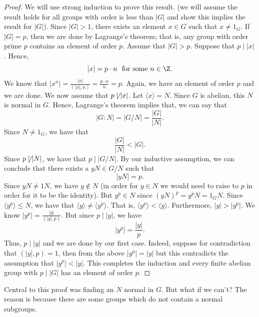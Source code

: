 \begin{proof}
We will use strong induction to prove this result. (we will assume the result holds for all  groups with order is less than \( | G  |  \) and show this implies the result for \( | G  |  \)). Since \( | G  |  > 1  \), there exists an element \( x \in G  \) such that \( x \neq {1}_{G} \). If \( | G  |  = p  \), then we are done by Lagrange's theorem; that is, any group with order prime \( p  \) contains an element of order \( p  \). Assume that \( | G  |  > p  \). Suppose that \( p \mid | x  |  \). Hence,  
\[  | x  |  = p \cdot n \ \ \text{for some} \ n \in \Z.  \]
We know that \( | x^{n}  |  = \frac{ | x  |  }{  (| x  | , n )  } = \frac{ p \cdot n   }{ n  }   = p  \). Again, we have an element of order \( p  \) and we are done. We now assume that \( p \not\mid | x  |  \). Let \( \langle  x  \rangle = N  \). Since \( G  \) is abelian, this \( N  \) is normal in \( G  \). Hence, Lagrange's theorem implies that, we can say that 
\[  | G : N  |  = \Big|   G/ N  \Big| = \frac{ | G  |  }{  | N  |  }.   \]
Since \( N \neq {1}_{G}  \), we have that 
\[  \frac{ | G  |  }{  | N  |  }  < |  G  |. \]
Since \( p \not\mid | N  |  \), we have that \( p \mid |  G /  N  |  \). By our inductive assumption, we can conclude that there exists a \( y N \in G / N  \) such that 
\[  | y N  |  = p. \]
Since \( y N \neq 1 N  \), we have \( y \notin N  \) (in order for \( y \in N  \) we would need to raise to \( p  \) in order for it to be the identity). But \( y^{p} \in N  \) since \( (yN)^{p} = y^{p} N  = {1}_{G} N  \). Since \( \langle  y^{p} \rangle \leq N    \), we have that \( \langle  y \rangle \neq \langle  y^{p} \rangle \). That is, \( \langle   y^{p} \rangle < \langle y  \rangle \). Furthermore, \( | y  |  > | y^{p} |  \). We know \( | y^{p} |  = \frac{ | y  |   }{  (| y | , p ) }  \). But since \( p \mid | y  |  \), we have   
\[  | y^{p} |  = \frac{ | y  |  }{ p  }.  \]
Thus, \( p \mid | y  |  \) and we are done by our first case. Indeed, suppose for contradiction that \( (| y  | , p ) = 1  \), then from the above \( | y^{p} |  = | y  |  \) but this contradicts the assumption that \( | y^{p} |  < | y  |  \). This completes the induction and every finite abelian group with \( p \mid |  G  |  \) has an element of order \(  p  \).
\end{proof}

Central to this proof was finding an \( N  \) normal in \( G  \). But what if we can't? The reason is because there are some groups which do not contain a normal subgroups. 

